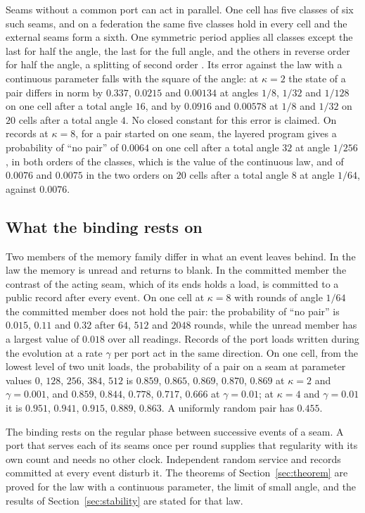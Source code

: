 \documentclass[11pt]{article}
\theoremstyle{definition}
\theoremstyle{remark}
\theoremstyle{plain}
\begin{document}
Seams without a common port can act in parallel. One cell has five classes
of six such seams, and on a federation the same five classes hold in every
cell and the external seams form a sixth. One symmetric period applies all
classes except the last for half the angle, the last for the full angle,
and the others in reverse order for half the angle, a splitting of second
order \cite{strang1968}. Its error against the law with a continuous
parameter falls with the square of the angle: at $\kappa=2$ the state of a
pair differs in norm by $0.337$, $0.0215$ and $0.00134$ at angles $1/8$,
$1/32$ and $1/128$ on one cell after a total angle $16$, and by $0.0916$
and $0.00578$ at $1/8$ and $1/32$ on $20$ cells after a total angle $4$.
No closed constant for this error is claimed. On records at $\kappa=8$, for a
pair started on one seam, the layered program gives a probability of ``no
pair'' of $0.0064$ on one cell after a total angle $32$ at angle $1/256$,
in both orders of the classes, which is the value of the continuous law,
and of $0.0076$ and $0.0075$ in the two orders on $20$ cells after a total
angle $8$ at angle $1/64$, against $0.0076$.

\subsection{What the binding rests on}

Two members of the memory family differ in what an event leaves behind. In
the law the memory is unread and returns to blank. In the committed member
the contrast of the acting seam, which of its ends holds a load, is
committed to a public record after every event. On one cell at $\kappa=8$
with rounds of angle $1/64$ the committed member does not hold the pair:
the probability of ``no pair'' is $0.015$, $0.11$ and $0.32$ after $64$,
$512$ and $2048$ rounds, while the unread member has a largest value of
$0.018$ over all readings. Records of the port loads written during the
evolution at a rate $\gamma$ per port act in the same direction. On one
cell, from the lowest level of two unit loads, the probability of a pair on
a seam at parameter values $0$, $128$, $256$, $384$, $512$ is $0.859$,
$0.865$, $0.869$, $0.870$, $0.869$ at $\kappa=2$ and $\gamma=0.001$, and
$0.859$, $0.844$, $0.778$, $0.717$, $0.666$ at $\gamma=0.01$; at
$\kappa=4$ and $\gamma=0.01$ it is $0.951$, $0.941$, $0.915$, $0.889$,
$0.863$. A uniformly random pair has $0.455$.

The binding rests on the regular phase between successive events of a
seam. A port that serves each of its seams once per round supplies that
regularity with its own count and needs no other clock. Independent
random service and records committed at every event disturb it. The
theorems of Section~\ref{sec:theorem} are proved for the law with a
continuous parameter, the limit of small angle, and the results of
Section~\ref{sec:stability} are stated for that law.
\end{document}
